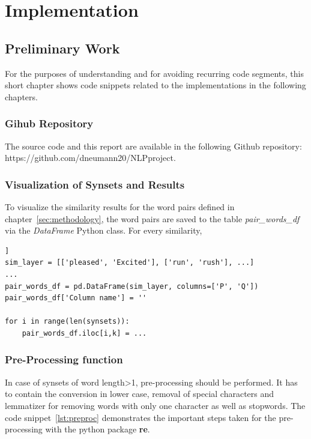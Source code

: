\documentclass[conference]{IEEEtran}
\begin{document}
\section{Implementation}\label{sec:implementation}

\subsection{Preliminary Work}

For the purposes of understanding and for avoiding recurring code segments, this short chapter shows code snippets related to the implementations in the following chapters.

\subsubsection{Gihub Repository}

The source code and this report are available in the following Github repository: https://github.com/dneumann20/NLPproject.

\subsubsection{Visualization of Synsets and Results}

To visualize the similarity results for the word pairs defined in chapter~\ref{sec:methodology}, the word pairs are saved to the table \textit{pair\_words\_df} via the \textit{DataFrame} Python class. For every similarity, 

\begin{lstlisting}[frame=single, label=lst:table, caption={}, captionpos=b]]
sim_layer = [['pleased', 'Excited'], ['run', 'rush'], ...]
...
pair_words_df = pd.DataFrame(sim_layer, columns=['P', 'Q'])
pair_words_df['Column name'] = ''

for i in range(len(synsets)):
    pair_words_df.iloc[i,k] = ...
\end{lstlisting}

\subsubsection{Pre-Processing function}\label{sec:preproc}

In case of synsets of word length>1,  pre-processing should be performed. It has to contain the conversion in lower case, removal of special characters and lemmatizer for removing words with only one character as well as stopwords. The code snippet~\ref{lst:preproc} demonstrates the important steps taken for the pre-processing with the python package \textbf{re}.
\end{document}
